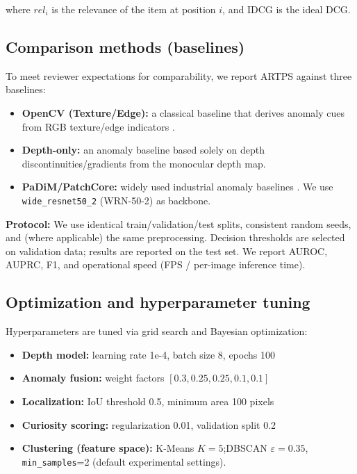 \documentclass[12pt]{article}
\begin{document}
where \(rel_i\) is the relevance of the item at position \(i\), and IDCG is the ideal DCG.

\subsection{Comparison methods (baselines)}
To meet reviewer expectations for comparability, we report ARTPS against three baselines:
\begin{itemize}
\item \textbf{OpenCV (Texture/Edge):} a classical baseline that derives anomaly cues from RGB texture/edge indicators \cite{opencv2023}.
\item \textbf{Depth-only:} an anomaly baseline based solely on depth discontinuities/gradients from the monocular depth map.
\item \textbf{PaDiM/PatchCore:} widely used industrial anomaly baselines \cite{defard2021padim,roth2021towards}. We use \texttt{wide\_resnet50\_2} (WRN-50-2) as backbone.
\end{itemize}

\textbf{Protocol:} We use identical train/validation/test splits, consistent random seeds, and (where applicable) the same preprocessing. Decision thresholds are selected on validation data; results are reported on the test set. We report AUROC, AUPRC, F1, and operational speed (FPS / per-image inference time).

\subsection{Optimization and hyperparameter tuning}
Hyperparameters are tuned via grid search and Bayesian optimization:

\begin{itemize}
\item \textbf{Depth model:} learning rate 1e-4, batch size 8, epochs 100
\item \textbf{Anomaly fusion:} weight factors \([0.3, 0.25, 0.25, 0.1, 0.1]\)
\item \textbf{Localization:} IoU threshold 0.5, minimum area 100 pixels
\item \textbf{Curiosity scoring:} regularization 0.01, validation split 0.2
\item \textbf{Clustering (feature space):} K-Means \(K=5\);\linebreak DBSCAN \(\varepsilon=0.35\), \texttt{min\_samples}=2 (default experimental settings).
\end{itemize}
\end{document}
